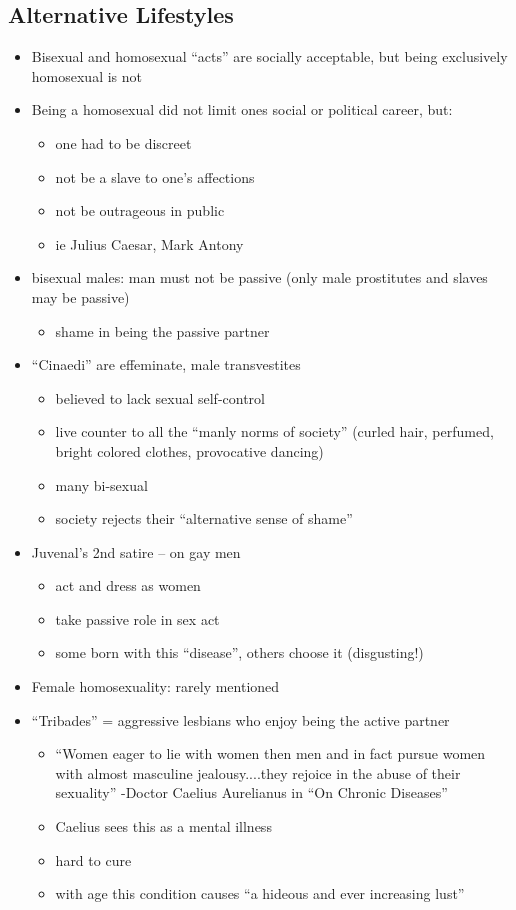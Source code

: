 \documentclass[12pt, twoside]{article}
\begin{document}
\subsection{Alternative Lifestyles}
\begin{itemize}
\item Bisexual and homosexual “acts” are socially acceptable, but being exclusively homosexual is not
\item Being a homosexual did not limit ones social or political career, but:
	\begin{itemize}
	\item one had to be discreet
	\item not be a slave to one’s affections
	\item not be outrageous in public
	\item ie Julius Caesar, Mark Antony
	\end{itemize}
\item bisexual males: man must not be passive (only male prostitutes and slaves may be passive)
	\begin{itemize}
	\item shame in being the passive partner
	\end{itemize}
\item “Cinaedi” are effeminate, male transvestites
	\begin{itemize}
	\item believed to lack sexual self-control
	\item live counter to all the “manly norms of
	society” (curled hair, perfumed, bright colored
	clothes, provocative dancing) 
	\item many bi-sexual
	\item society rejects their “alternative sense of 
	shame”
	\end{itemize}
\item Juvenal’s 2nd satire – on gay men
	\begin{itemize}
	\item act and dress as women
	\item take passive role in sex act
	\item some born with this “disease”, others choose it (disgusting!)
	\end{itemize}
\item Female homosexuality: rarely mentioned
\item “Tribades” = aggressive lesbians who enjoy being the active partner
	\begin{itemize}
	\item “Women eager to lie with women then men and in fact pursue women with almost masculine jealousy....they rejoice in the abuse of their sexuality” -Doctor Caelius Aurelianus in “On Chronic Diseases”
	\item Caelius sees this as a mental illness
	\item hard to cure
	\item with age this condition causes “a hideous and ever increasing lust”
	\end{itemize}
\end{itemize}
\end{document}
